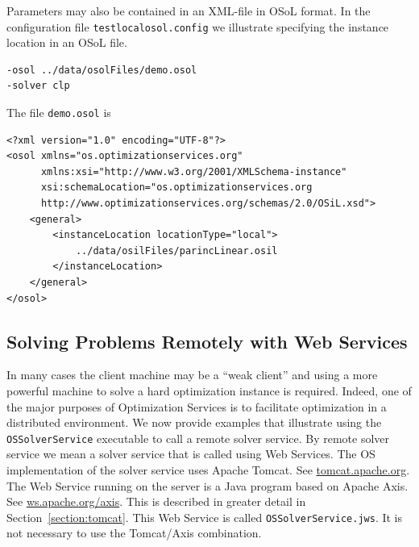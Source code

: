 \documentclass[11pt]{article}
\renewcommand{\_}{{\char"5F}}
\renewcommand{\{}{{\char"7B}}
\renewcommand{\}}{{\char"7D}}
\renewcommand{\^}{{\char"0D}}
\renewcommand{\'}{{\char"0D}}
\begin{document}
\begin{enumerate}[Step 1:]
Parameters may also be contained in an XML-file in OSoL format. In the configuration file
{\tt testlocalosol.config} we illustrate specifying the instance location in an OSoL file.
\begin{verbatim}
-osol ../data/osolFiles/demo.osol
-solver clp
\end{verbatim}
The file {\tt demo.osol} is

\begin{verbatim}
<?xml version="1.0" encoding="UTF-8"?>
<osol xmlns="os.optimizationservices.org"
      xmlns:xsi="http://www.w3.org/2001/XMLSchema-instance"
      xsi:schemaLocation="os.optimizationservices.org
      http://www.optimizationservices.org/schemas/2.0/OSiL.xsd">
    <general>
        <instanceLocation locationType="local">
            ../data/osilFiles/parincLinear.osil
        </instanceLocation>
    </general>
</osol>
\end{verbatim}


\subsection{Solving Problems Remotely with Web Services}\label{section:servicemethods}

In many cases the client machine may be a ``weak client'' and  using a more powerful machine to solve a
hard optimization instance is required. Indeed, one of the major purposes of Optimization Services is to
facilitate optimization in a distributed environment.   We now provide examples that illustrate using the
{\tt OSSolverService} executable to call a remote solver service.   By remote solver service we mean a
solver service that is called using Web Services.  The OS implementation  of the solver service
uses Apache Tomcat. See \url{tomcat.apache.org}. The Web Service running on the server
is a Java program based on Apache Axis. See \url{ws.apache.org/axis}. This is described
in greater detail in Section~\ref{section:tomcat}.
This Web Service is called {\tt OSSolverService.jws}.
It is not necessary to use the Tomcat/Axis combination.




\end{enumerate}
\end{document}
